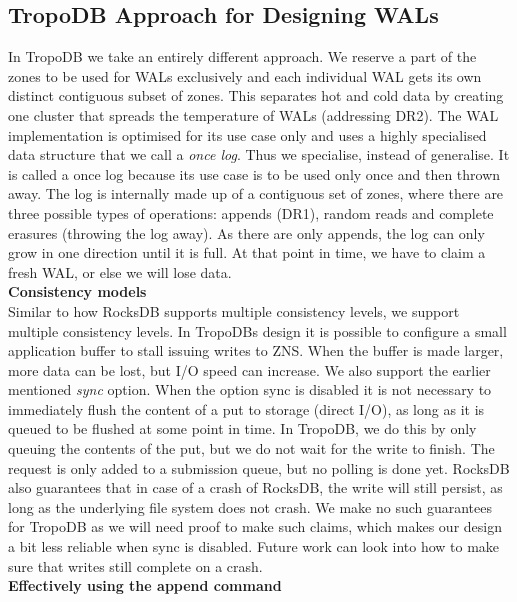 \subsection{TropoDB Approach for Designing WALs}
\label{sec:wals}
In TropoDB we take an entirely different approach. We reserve a part of the zones to be used for WALs exclusively and each individual WAL gets its own distinct contiguous subset of zones. This separates hot and cold data by creating one cluster that spreads the temperature of WALs (addressing DR2). The WAL implementation is optimised for its use case only and uses a highly specialised data structure that we call a \textit{once log}. Thus we specialise, instead of generalise. It is called a once log because its use case is to be used only once and then thrown away. The log is internally made up of a contiguous set of zones, where there are three possible types of operations: appends (DR1), random reads and complete erasures (throwing the log away). As there are only appends, the log can only grow in one direction until it is full. At that point in time, we have to claim a fresh WAL, or else we will lose data. \\
\textbf{Consistency models}\\
Similar to how RocksDB supports multiple consistency levels, we support multiple consistency levels. In TropoDBs design it is possible to configure a small application buffer to stall issuing writes to ZNS. When the buffer is made larger, more data can be lost, but I/O speed can increase. We also support the earlier mentioned \textit{sync} option. When the option sync is disabled it is not necessary to immediately flush the content of a put to storage (direct I/O), as long as it is queued to be flushed at some point in time. In TropoDB, we do this by only queuing the contents of the put, but we do not wait for the write to finish. The request is only added to a submission queue, but no polling is done yet. RocksDB also guarantees that in case of a crash of RocksDB, the write will still persist, as long as the underlying file system does not crash. We make no such guarantees for TropoDB as we will need proof to make such claims, which makes our design a bit less reliable when sync is disabled. Future work can look into how to make sure that writes still complete on a crash. \\
\textbf{Effectively using the append command}\\

